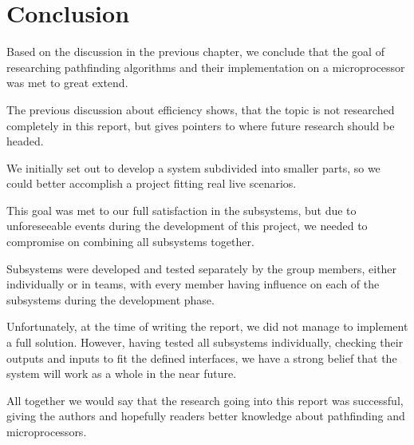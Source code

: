 \chapter{Conclusion}\label{ch:conclusion}
Based on the discussion in the previous chapter,
we conclude that the goal of researching pathfinding algorithms and their implementation on a microprocessor was met to great extend.

The previous discussion about efficiency shows,
that the topic is not researched completely in this report,
but gives pointers to where future research should be headed.

We initially set out to develop a system subdivided into smaller parts,
so we could better accomplish a project fitting real live scenarios.

This goal was met to our full satisfaction in the subsystems,
but due to unforeseeable events during the development of this project,
we needed to compromise on combining all subsystems together.

Subsystems were developed and tested separately by the group members,
either individually or in teams,
with every member having influence on each of the 
subsystems during the development phase.

Unfortunately, at the time of writing the report,
we did not manage to implement a full solution.
However, having tested all subsystems individually,
checking their outputs and inputs to fit the defined interfaces,
we have a strong belief that the system will work as a whole in the near future.

All together we would say that the research going into this report was successful,
giving the authors and hopefully readers better knowledge about pathfinding and microprocessors.